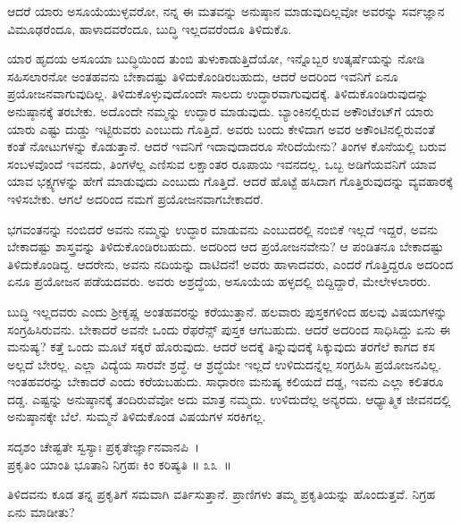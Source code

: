 \begin{artha}
ಆದರೆ ಯಾರು ಅಸೂಯೆಯುಳ್ಳವರೋ, ನನ್ನ ಈ ಮತವನ್ನು ಅನುಷ್ಠಾನ ಮಾಡುವುದಿಲ್ಲವೋ ಅವರನ್ನು ಸರ್ವಜ್ಞಾನ ವಿಮೂಢರೆಂದೂ, ಹಾಳಾದವರೆಂದೂ, ಬುದ್ಧಿ ಇಲ್ಲದವರೆಂದೂ ತಿಳಿದುಕೊ.
\end{artha}

ಯಾರ ಹೃದಯ ಅಸೂಯಾ ಬುದ್ಧಿಯಿಂದ ತುಂಬಿ ತುಳುಕಾಡುತ್ತಿದೆಯೋ, ಇನ್ನೊಬ್ಬರ ಉತ್ಕರ್ಷೆಯನ್ನು ನೋಡಿ ಸಹಿಸಲಾರನೋ ಅಂತಹವನು ಬೇಕಾದಷ್ಟು ತಿಳಿದುಕೊಂಡಿರಬಹುದು, ಆದರೆ ಅದರಿಂದ ಇವನಿಗೆ ಏನೂ ಪ್ರಯೋಜನವಾಗುವುದಿಲ್ಲ. ತಿಳಿದುಕೊಳ್ಳುವುದೊಂದೇ ಸಾಲದು ಉದ್ಧಾರವಾಗುವುದಕ್ಕೆ. ತಿಳಿದುಕೊಂಡಿರುವುದನ್ನು ಅನುಷ್ಠಾನಕ್ಕೆ ತರಬೇಕು. ಅದೊಂದೇ ನಮ್ಮನ್ನು ಉದ್ಧಾರ ಮಾಡುವುದು. ಬ್ಯಾಂಕಿನಲ್ಲಿರುವ ಅಕೌಂಟೆಂಟ್​ಗೆ ಯಾರು ಯಾರು ಎಷ್ಟು ದುಡ್ಡು ಇಟ್ಟಿರುವರು ಎಂಬುದು ಗೊತ್ತಿದೆ. ಅವರು ಬಂದು ಕೇಳಿದಾಗ ಅವರ ಅಕೌಂಟಿನಲ್ಲಿರುವಂತೆ ಕಂತೆ ನೋಟುಗಳನ್ನು ಕೊಡುತ್ತಾನೆ. ಆದರೆ ಇವನಿಗೆ ಇದಾವುದಾದರೂ ಸೇರಿದೆಯೇನು? ತಿಂಗಳ ಕೊನೆಯಲ್ಲಿ ಬರುವ ಸಂಬಳವೊಂದೆ ಇವನದು, ತಿಂಗಳೆಲ್ಲ ಎಣಿಸುವ ಲಕ್ಷಾಂತರ ರೂಪಾಯಿ ಇವನದಲ್ಲ. ಒಬ್ಬ ಅಡಿಗೆಯವನಿಗೆ ಯಾವ ಯಾವ ಭಕ್ಷ್ಯಗಳನ್ನು ಹೇಗೆ ಮಾಡುವುದು ಎಂಬುದು ಗೊತ್ತಿದೆ. ಆದರೆ ಹೊಟ್ಟೆ ಹಸಿದಾಗ ಗೊತ್ತಿರುವುದನ್ನು ವ್ಯವಹಾರಕ್ಕೆ ಇಳಿಸಬೇಕು. ಆಗಲೆ ಅದರಿಂದ ನಮಗೆ ಪ್ರಯೋಜನವಾಗಬೇಕಾದರೆ.

ಭಗವಂತನನ್ನು ನಂಬಿದರೆ ಅವನು ನಮ್ಮನ್ನು ಉದ್ಧಾರ ಮಾಡುವನು ಎಂಬುದರಲ್ಲಿ ನಂಬಿಕೆ ಇಲ್ಲದೆ ಇದ್ದರೆ, ಅವನು ಬೇಕಾದಷ್ಟು ಶಾಸ್ತ್ರವನ್ನು ತಿಳಿದುಕೊಂಡಿರಬಹುದು. ಅದರಿಂದ ಆದ ಪ್ರಯೋಜನವೇನು? ಆ ಪಂಡಿತನೂ ಬೇಕಾದಷ್ಟು ತಿಳಿದುಕೊಂಡಿದ್ದ. ಆದರೇನು, ಅವನು ನದಿಯನ್ನು ದಾಟಿದನೆ! ಅವರು ಹಾಳಾದವರು, ಎಂದರೆ ಗೊತ್ತಿದ್ದರೂ ಅದರಿಂದ ಏನೂ ಪ್ರಯೋಜನ ಪಡೆಯದವರು. ಅವರು ಅಶ್ರದ್ಧೆಯ, ಅಸೂಯೆಯ ಹಳ್ಳದಲ್ಲಿ ಬಿದ್ದಿದ್ದಾರೆ, ಮೇಲೇಳಲಾರರು.

ಬುದ್ಧಿ ಇಲ್ಲದವರು ಎಂದು ಶ‍್ರೀಕೃಷ್ಣ ಅಂತಹವರನ್ನು ಕರೆಯುತ್ತಾನೆ. ಹಲವಾರು ಪುಸ್ತಕಗಳಿಂದ ಹಲವು ವಿಷಯಗಳನ್ನು ಸಂಗ್ರಹಿಸಿರುವನು. ಬೇಕಾದರೆ ಅವನೇ ಒಂದು ರೆಫರೆನ್ಸ್ ಪುಸ್ತಕ ಆಗಬಹುದು. ಆದರೆ ಅದರಿಂದ ಸಾಧಿಸಿದ್ದು ಏನು ಈ ಮನುಷ್ಯ? ಕತ್ತೆ ಒಂದು ಮೂಟೆ ಸಕ್ಕರೆ ಹೊರುವುದು. ಆದರೆ ಅದಕ್ಕೆ ತಿನ್ನುವುದಕ್ಕೆ ಸಿಕ್ಕುವುದು ತರಗೆಲೆ ಕಾಗದ ಕಸ ಅಲ್ಲದೆ ಬೇರಲ್ಲ. ಎಲ್ಲಾ ವಿದ್ಯೆಯ ಸಾರವೇ ಶ್ರದ್ಧೆ. ಆ ಶ್ರದ್ಧೆಯೇ ಇಲ್ಲದೆ ಉಳಿದುದನ್ನೆಲ್ಲ ಸಂಗ್ರಹಿಸಿ ಪ್ರಯೋಜನವಿಲ್ಲ. ಇಂತಹವರನ್ನು ಬೇಕಾದರೆ  ಎಂದು ಕರೆಯಬಹುದು. ಸಾಧಾರಣ ಮನುಷ್ಯ ಕಲಿಯದೆ ದಡ್ಡ, ಇವನು ಎಲ್ಲಾ ಕಲಿತರೂ ದಡ್ಡ. ಎಷ್ಟನ್ನು ಅನುಷ್ಠಾನಕ್ಕೆ ತಂದಿರುವೆವೋ ಅದು ಮಾತ್ರ ನಮ್ಮದು. ಉಳಿದುದೆಲ್ಲ ಅನ್ಯರದು. ಆಧ್ಯಾತ್ಮಿಕ ಜೀವನದಲ್ಲಿ ಅನುಷ್ಠಾನಕ್ಕೇ ಬೆಲೆ. ಸುಮ್ಮನೆ ತಿಳಿದುಕೊಂಡ ವಿಷಯಗಳ ಸರಕಿಗಲ್ಲ.

\begin{shloka}
ಸದೃಶಂ ಚೇಷ್ಟತೇ ಸ್ವಸ್ಯಾಃ ಪ್ರಕೃತೇರ್ಜ್ಞಾನವಾನಪಿ~।\\ಪ್ರಕೃತಿಂ ಯಾಂತಿ ಭೂತಾನಿ ನಿಗ್ರಹಃ ಕಿಂ ಕರಿಷ್ಯತಿ \hfill॥ ೩೩~॥
\end{shloka}

\begin{artha}
ತಿಳಿದವನು ಕೂಡ ತನ್ನ ಪ್ರಕೃತಿಗೆ ಸಮವಾಗಿ ವರ್ತಿಸುತ್ತಾನೆ. ಪ್ರಾಣಿಗಳು ತಮ್ಮ ಪ್ರಕೃತಿಯನ್ನು ಹೊಂದುತ್ತವೆ. ನಿಗ್ರಹ ಏನು ಮಾಡೀತು?
\end{artha}

